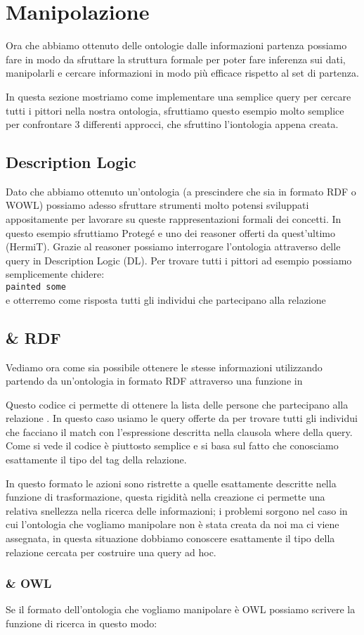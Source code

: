 \section{Manipolazione}
	Ora che abbiamo ottenuto delle ontologie dalle informazioni partenza possiamo fare in modo da sfruttare la struttura formale per poter fare inferenza sui dati, manipolarli e cercare informazioni in modo più efficace rispetto al set di partenza.
	
	In questa sezione mostriamo come implementare una semplice query per cercare tutti i pittori nella nostra ontologia, sfruttiamo questo esempio molto semplice per confrontare 3 differenti approcci, che sfruttino l'iontologia appena creata.
	\subsection{Description Logic}
		Dato che abbiamo ottenuto un'ontologia (a prescindere che sia in formato RDF o WOWL) possiamo adesso sfruttare strumenti molto potensi sviluppati appositamente per lavorare su queste rappresentazioni formali dei concetti. In questo esempio sfruttiamo Protegé e uno dei reasoner offerti da quest'ultimo (HermiT). Grazie al reasoner possiamo interrogare l'ontologia attraverso delle query in Description Logic (DL). Per trovare tutti i pittori ad esempio possiamo semplicemente chidere:\\
		\texttt{painted \color{purple}some\color{black}}\\
		e otterremo come risposta tutti gli individui che partecipano alla relazione 
	\subsection{\cduce \& RDF}
		Vediamo ora come sia possibile ottenere le stesse informazioni utilizzando  partendo da un'ontologia in formato RDF attraverso una funzione in \cduce
		
		Questo codice ci permette di ottenere la lista delle persone che partecipano alla relazione . In questo caso usiamo le query offerte da \cduce per trovare tutti gli individui che facciano il match con l'espressione descritta nella clausola where della query. Come si vede il codice è piuttosto semplice e si basa sul fatto che conosciamo esattamente il tipo del tag della relazione.
		
		In questo formato le azioni sono ristrette a quelle esattamente descritte nella funzione di trasformazione, questa rigidità nella creazione ci permette una relativa snellezza nella ricerca delle informazioni; i problemi sorgono nel caso in cui l'ontologia che vogliamo manipolare non è stata creata da noi ma ci viene assegnata, in questa situazione dobbiamo conoscere esattamente il tipo della relazione cercata per costruire una query ad hoc.
		
	\subsubsection{\cduce \& OWL}
		Se il formato dell'ontologia che vogliamo manipolare è OWL possiamo scrivere la funzione di ricerca in questo modo:
		
		